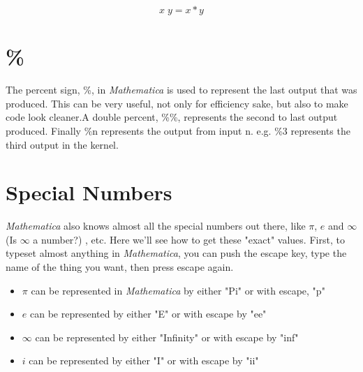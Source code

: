 \documentclass[11pt,a4paper,twoside]{article}
\begin{document}
			\[ x \; y = x*y \]
			
		\section{\%}
		
			The percent sign, \%, in \textit{Mathematica} is used to represent the last output that was produced.  This can be very useful, not only for efficiency sake, but also to make code look cleaner.A double percent, \%\%, represents the second to last output produced.  Finally \%n represents the output from input n.  e.g. \%3 represents the third output in the kernel. 

		\section{Special Numbers}
				
			\textit{Mathematica} also knows almost all the special numbers out there, like $\pi$, $e$ and $\infty$ (Is $\infty$ a number?) , etc.  Here we'll see how to get these "exact" values.  First, to typeset almost anything in \textit{Mathematica}, you can push the escape key, type the name of the thing you want, then press escape again.
				
			\begin{itemize}
				
				\item %
					
					$ \pi $ can be represented in \textit{Mathematica} by either "Pi" or with escape, "p"
					
				\item %
					
					$ e $ can be represented by either "E" or with escape by "ee"
						
				\item %
					
					$ \infty $ can be represented by either "Infinity" or with escape by "inf"
						
				\item %
					
					$ i $ can be represented by either "I" or with escape by "ii"
				
			\end{itemize}
\end{document}
